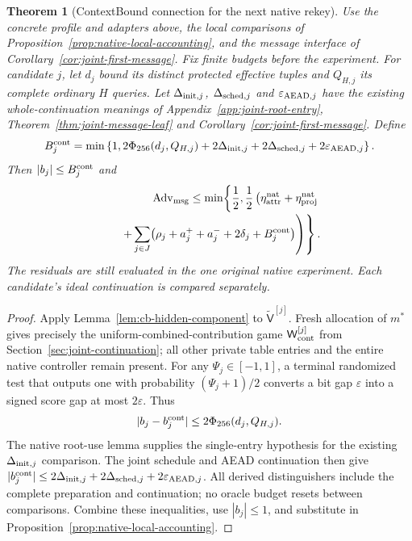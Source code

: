 \documentclass[pdflatex]{sn-jnl}
\theoremstyle{thmstyleone}
\newtheorem{theorem}{Theorem}[section]
\theoremstyle{thmstylethree}
\theoremstyle{thmstyletwo}
\begin{document}
\begin{theorem}[ContextBound connection for the next native rekey]
\label{thm:cb-next-rekey}
Use the concrete profile and adapters above, the local comparisons of
Proposition~\ref{prop:native-local-accounting}, and the message interface
of Corollary~\ref{cor:joint-first-message}. Fix finite budgets before the
experiment. For candidate $j$, let $d_j$ bound its distinct protected
effective tuples and $Q_{H,j}$ its complete ordinary $H$ queries. Let
$\Delta_{{\rm init},j}$, $\Delta_{{\rm sched},j}$ and
$\varepsilon_{{\rm AEAD},j}$ have the existing whole-continuation meanings
of Appendix~\ref{app:joint-root-entry},
Theorem~\ref{thm:joint-message-leaf} and
Corollary~\ref{cor:joint-first-message}. Define
\begin{equation}
 B_j^{\rm cont}=\min\left\{1,
 2\Phi_{256}(d_j,Q_{H,j})+2\Delta_{{\rm init},j}
 +2\Delta_{{\rm sched},j}+2\varepsilon_{{\rm AEAD},j}\right\}.
 \label{eq:cb-continuation-bound}
\end{equation}
Then $|b_j|\le B_j^{\rm cont}$ and
\begin{equation}
\begin{split}
 \operatorname{Adv}_{\rm msg}\le
 \min\!\left\{\frac12,\frac12\left(
 \eta_{\rm attr}^{\rm nat}+\eta_{\rm proj}^{\rm nat}\right.\right.\\[-2pt]
 \left.\left.\qquad+
 \sum_{j\in J}\bigl(\rho_j+a_j^++a_j^-+2\delta_j+B_j^{\rm cont}\bigr)
 \right)\right\}.
\end{split}
 \label{eq:cb-native-bound}
\end{equation}
The residuals are still evaluated in the one original native experiment.
Each candidate's ideal continuation is compared separately.
\end{theorem}
\begin{proof}
Apply Lemma~\ref{lem:cb-hidden-component} to
$\widetilde{\mathsf V}^{[j]}$. Fresh allocation of $m^*$ gives precisely
the uniform-combined-contribution game
$\mathsf W_{\rm cont}^{[j]}$ from
Section~\ref{sec:joint-continuation}; all other private table entries and
the entire native controller remain present. For any
$\Psi_j\in[-1,1]$, a terminal randomized test that outputs one with
probability $(\Psi_j+1)/2$ converts a bit gap $\varepsilon$ into a signed
score gap at most $2\varepsilon$. Thus
\[
 |b_j-b_j^{\rm cont}|\le2\Phi_{256}(d_j,Q_{H,j}).
\]
The native root-use lemma supplies the single-entry hypothesis for the
existing $\Delta_{{\rm init},j}$ comparison. The joint schedule and AEAD
continuation then give
$|b_j^{\rm cont}|\le2\Delta_{{\rm init},j}
 +2\Delta_{{\rm sched},j}+2\varepsilon_{{\rm AEAD},j}$.
All derived distinguishers include the complete preparation and continuation;
no oracle budget resets between comparisons. Combine these inequalities, use
$|b_j|\le1$, and substitute in
Proposition~\ref{prop:native-local-accounting}.
\end{proof}
\end{document}

